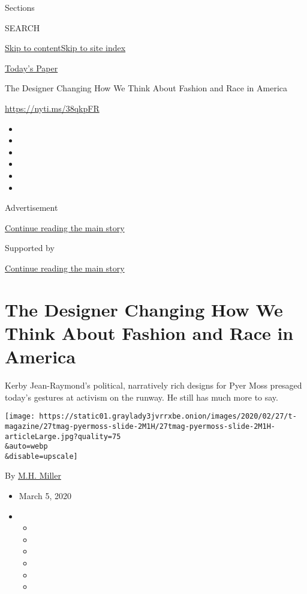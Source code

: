 Sections

SEARCH

\protect\hyperlink{site-content}{Skip to
content}\protect\hyperlink{site-index}{Skip to site index}

\href{https://myaccount.nytimes3xbfgragh.onion/auth/login?response_type=cookie\&client_id=vi}{}

\href{https://www.nytimes3xbfgragh.onion/section/todayspaper}{Today's
Paper}

The Designer Changing How We Think About Fashion and Race in America

\url{https://nyti.ms/38qkpFR}

\begin{itemize}
\item
\item
\item
\item
\item
\item
\end{itemize}

Advertisement

\protect\hyperlink{after-top}{Continue reading the main story}

Supported by

\protect\hyperlink{after-sponsor}{Continue reading the main story}

\hypertarget{the-designer-changing-how-we-think-about-fashion-and-race-in-america}{%
\section{The Designer Changing How We Think About Fashion and Race in
America}\label{the-designer-changing-how-we-think-about-fashion-and-race-in-america}}

Kerby Jean-Raymond's political, narratively rich designs for Pyer Moss
presaged today's gestures at activism on the runway. He still has much
more to say.

\texttt{[image: https://static01.graylady3jvrrxbe.onion/images/2020/02/27/t-magazine/27tmag-pyermoss-slide-2M1H/27tmag-pyermoss-slide-2M1H-articleLarge.jpg?quality=75\\\&auto=webp\\\&disable=upscale]}

By \href{https://www.nytimes3xbfgragh.onion/by/m-h-miller}{M.H. Miller}

\begin{itemize}
\item
  March 5, 2020
\item
  \begin{itemize}
  \item
  \item
  \item
  \item
  \item
  \item
  \end{itemize}
\end{itemize}

